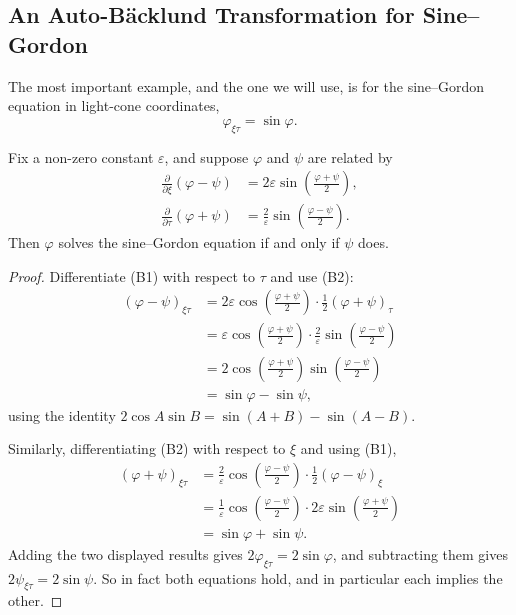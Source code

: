 \documentclass[a4paper]{scrartcl}
\begin{document}
\subsection{An Auto-B\"acklund Transformation for Sine--Gordon}

The most important example, and the one we will use, is for the sine--Gordon equation in light-cone coordinates,
$$
\varphi_{\xi\tau} = \sin\varphi.
$$

\begin{proposition}
	Fix a non-zero constant $\varepsilon$, and suppose $\varphi$ and $\psi$ are related by
	\begin{align}
		\frac{\partial}{\partial\xi}\left(\varphi - \psi\right) &= 2\varepsilon\sin\left(\frac{\varphi+\psi}{2}\right),\tag{B1}\\
		\frac{\partial}{\partial\tau}\left(\varphi + \psi\right) &= \frac{2}{\varepsilon}\sin\left(\frac{\varphi-\psi}{2}\right).\tag{B2}
	\end{align}
	Then $\varphi$ solves the sine--Gordon equation if and only if $\psi$ does.
\end{proposition}
\begin{proof}
	Differentiate (B1) with respect to $\tau$ and use (B2):
	\begin{align*}
		\left(\varphi-\psi\right)_{\xi\tau} &= 2\varepsilon\cos\left(\frac{\varphi+\psi}{2}\right)\cdot\frac{1}{2}\left(\varphi+\psi\right)_\tau\\
		&= \varepsilon\cos\left(\frac{\varphi+\psi}{2}\right)\cdot\frac{2}{\varepsilon}\sin\left(\frac{\varphi-\psi}{2}\right)\\
		&= 2\cos\left(\frac{\varphi+\psi}{2}\right)\sin\left(\frac{\varphi-\psi}{2}\right)\\
		&= \sin\varphi - \sin\psi,
	\end{align*}
	using the identity $2\cos A\sin B = \sin(A+B) - \sin(A-B)$.

	Similarly, differentiating (B2) with respect to $\xi$ and using (B1),
	\begin{align*}
		\left(\varphi+\psi\right)_{\xi\tau} &= \frac{2}{\varepsilon}\cos\left(\frac{\varphi-\psi}{2}\right)\cdot\frac{1}{2}\left(\varphi-\psi\right)_\xi\\
		&= \frac{1}{\varepsilon}\cos\left(\frac{\varphi-\psi}{2}\right)\cdot2\varepsilon\sin\left(\frac{\varphi+\psi}{2}\right)\\
		&= \sin\varphi + \sin\psi.
	\end{align*}
	Adding the two displayed results gives $2\varphi_{\xi\tau} = 2\sin\varphi$, and subtracting them gives $2\psi_{\xi\tau} = 2\sin\psi$. So in fact both equations hold, and in particular each implies the other.
\end{proof}
\end{document}

